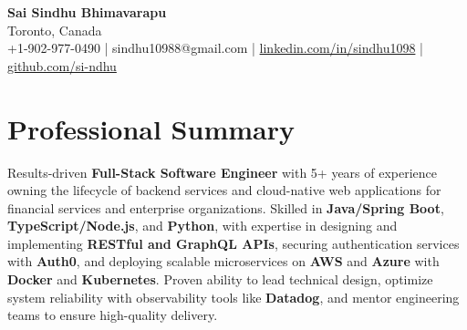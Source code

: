 \documentclass[letterpaper,11pt]{article}
\begin{document}
\begin{center}
  {\Large \textbf{Sai Sindhu Bhimavarapu}} \\
  Toronto, Canada \\
  +1-902-977-0490 \enspace | \enspace sindhu10988@gmail.com \enspace | \enspace \href{https://www.linkedin.com/in/sindhu1098/}{linkedin.com/in/sindhu1098} \enspace | \enspace \href{https://github.com/si-ndhu}{github.com/si-ndhu}
\end{center}

\section{Professional Summary}
  \begin{itemize}[leftmargin=0.15in, label={}]
    \small{\item{
     Results-driven \textbf{Full-Stack Software Engineer} with 5+ years of experience owning the lifecycle of backend services and cloud-native web applications for financial services and enterprise organizations. Skilled in \textbf{Java/Spring Boot}, \textbf{TypeScript/Node.js}, and \textbf{Python}, with expertise in designing and implementing \textbf{RESTful and GraphQL APIs}, securing authentication services with \textbf{Auth0}, and deploying scalable microservices on \textbf{AWS} and \textbf{Azure} with \textbf{Docker} and \textbf{Kubernetes}. Proven ability to lead technical design, optimize system reliability with observability tools like \textbf{Datadog}, and mentor engineering teams to ensure high-quality delivery.
    }}
  \end{itemize}
\vspace{-16pt}

\end{document}
